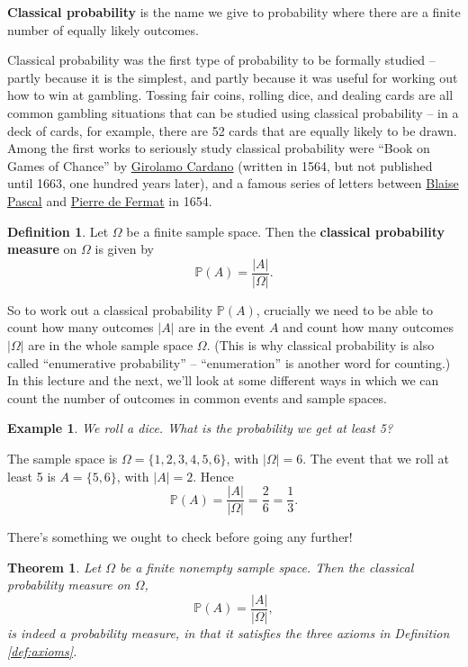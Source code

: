 \documentclass[
  a4paper,
]{book}
\newtheorem{theorem}{Theorem}[chapter]
\theoremstyle{definition}
\newtheorem{definition}{Definition}[chapter]
\theoremstyle{definition}
\newtheorem{example}{Example}[chapter]
\theoremstyle{definition}
\theoremstyle{definition}
\theoremstyle{remark}
\begin{document}
\textbf{Classical probability} is the name we give to probability where there are a finite number of equally likely outcomes.

Classical probability was the first type of probability to be formally studied -- partly because it is the simplest, and partly because it was useful for working out how to win at gambling. Tossing fair coins, rolling dice, and dealing cards are all common gambling situations that can be studied using classical probability -- in a deck of cards, for example, there are 52 cards that are equally likely to be drawn. Among the first works to seriously study classical probability were ``Book on Games of Chance'' by \href{https://mathshistory.st-andrews.ac.uk/Biographies/Cardan/}{Girolamo Cardano} (written in 1564, but not published until 1663, one hundred years later), and a famous series of letters between \href{https://mathshistory.st-andrews.ac.uk/Biographies/Pascal/}{Blaise Pascal} and \href{https://mathshistory.st-andrews.ac.uk/Biographies/Fermat/}{Pierre de Fermat} in 1654.

\begin{definition}
Let \(\Omega\) be a finite sample space. Then the \textbf{classical probability measure} on \(\Omega\) is given by
\[ \mathbb P(A) = \frac{|A|}{|\Omega|} . \]
\end{definition}

So to work out a classical probability \(\mathbb P(A)\), crucially we need to be able to count how many outcomes \(|A|\) are in the event \(A\) and count how many outcomes \(|\Omega|\) are in the whole sample space \(\Omega\). (This is why classical probability is also called ``enumerative probability'' -- ``enumeration'' is another word for counting.) In this lecture and the next, we'll look at some different ways in which we can count the number of outcomes in common events and sample spaces.

\begin{example}
\emph{We roll a dice. What is the probability we get at least 5?}

The sample space is \(\Omega = \{1,2,3,4,5,6\}\), with \(|\Omega| = 6\). The event that we roll at least 5 is \(A = \{5,6\}\), with \(|A| = 2\). Hence
\[ \mathbb P(A) = \frac{|A|}{|\Omega|} = \frac{2}{6} = \frac{1}{3} . \]
\end{example}

There's something we ought to check before going any further!

\begin{theorem}
Let \(\Omega\) be a finite nonempty sample space. Then the classical probability measure on \(\Omega\),
\[ \mathbb P(A) = \frac{|A|}{|\Omega|} , \]
is indeed a probability measure, in that it satisfies the three axioms in Definition \ref{def:axioms}.
\end{theorem}
\end{document}
